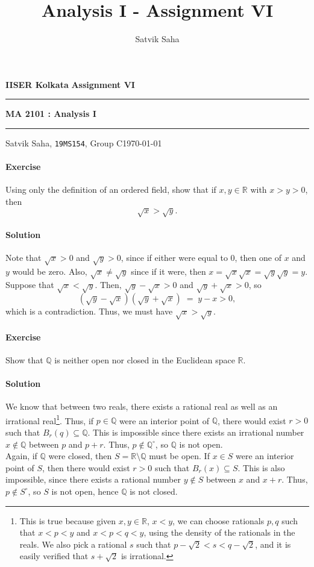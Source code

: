 \documentclass[10pt]{article}
\title{Analysis I - Assignment VI}
\author{Satvik Saha}
\date{}
\newcounter{prob}
\def\problem{\stepcounter{prob}\paragraph{Exercise \arabic{prob}}}
\def\solution{\paragraph{Solution}}
\newcommand\inte[1]{{#1}^\circ}
\begin{document}
        \par\textbf{IISER Kolkata} \hfill \textbf{Assignment VI}
        \vspace{3pt}
        \hrule
        \vspace{3pt}
        \begin{center}
                \LARGE{\textbf{MA 2101 : Analysis I}}
        \end{center}
        \vspace{3pt}
        \hrule
        \vspace{3pt}
        Satvik Saha, \texttt{19MS154}, Group C\hfill\today
        \vspace{20pt}

        \problem Using only the definition of an ordered field, show that if $x, y \in \mathbb{R}$ with $x > y > 0$, then
        \[
                \sqrt{x} > \sqrt{y}.
        \]

        \solution Note that $\sqrt{x} > 0$ and $\sqrt{y} > 0$, since if either were equal to $0$, then one of $x$ and $y$ would be zero.
        Also, $\sqrt{x} \neq \sqrt{y}$ since if it were, then $x = \sqrt{x}\sqrt{x} = \sqrt{y}\sqrt{y} = y$.
        Suppose that $\sqrt{x} < \sqrt{y}$. Then, $\sqrt{y} - \sqrt{x} > 0$ and $\sqrt{y} + \sqrt{x} > 0$, so
        \[
                (\sqrt{y} - \sqrt{x})(\sqrt{y} + \sqrt{x}) \;=\; y - x > 0,
        \]
        which is a contradiction. Thus, we must have $\sqrt{x} > \sqrt{y}$.

        \problem Show that $\mathbb{Q}$ is neither open nor closed in the Euclidean space $\mathbb{R}$.

        \solution We know that between two reals, there exists a rational real as well as an irrational real\footnote{This is true because given
        $x, y \in \mathbb{R}$, $x < y$, we can choose rationals $p, q$ such that $x < p < y$ and $x < p < q < y$, using the density of the rationals
        in the reals. We also pick a rational $s$ such that $p - \sqrt{2} < s < q - \sqrt{2}$, and it is easily verified that $s + \sqrt{2}$
        is irrational.}.
        Thus, if $p \in \mathbb{Q}$ were an interior point of $\mathbb{Q}$, there would exist $r > 0$ such that $B_r(q) \subseteq \mathbb{Q}$.
        This is impossible since there exists an irrational number $x \notin \mathbb{Q}$ between $p$ and $p + r$.
        Thus, $p \notin \inte{\mathbb{Q}}$, so $\mathbb{Q}$ is not open. \\

        Again, if $\mathbb{Q}$ were closed, then $S = \mathbb{R}\setminus\mathbb{Q}$ must be open. If $x \in S$ were an interior point
        of $S$, then there would exist $r > 0$ such that $B_r(x) \subseteq S$. This is also impossible, since there exists a rational
        number $y \notin S$ between $x$ and $x + r$. Thus, $p \notin \inte{S}$, so $S$ is not open, hence $\mathbb{Q}$ is not closed.
\end{document}
